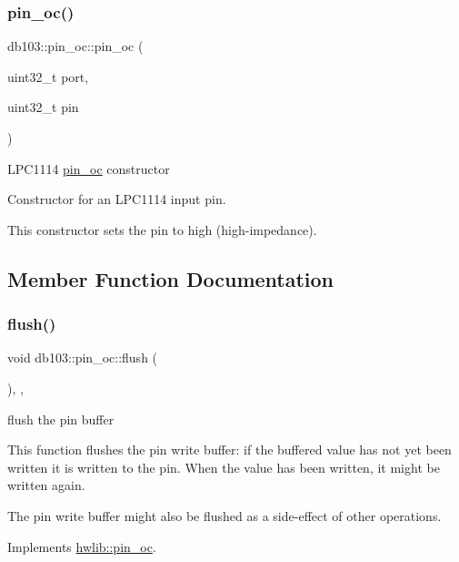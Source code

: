\subsubsection{\texorpdfstring{pin\+\_\+oc()}{pin\_oc()}}
{\footnotesize\ttfamily db103\+::pin\+\_\+oc\+::pin\+\_\+oc (\begin{DoxyParamCaption}\item[{uint32\+\_\+t}]{port,  }\item[{uint32\+\_\+t}]{pin }\end{DoxyParamCaption})\hspace{0.3cm}{\ttfamily [inline]}}

L\+P\+C1114 \hyperlink{classdb103_1_1pin__oc}{pin\+\_\+oc} constructor

Constructor for an L\+P\+C1114 input pin.

This constructor sets the pin to high (high-\/impedance). 

\subsection{Member Function Documentation}
\mbox{\label{classdb103_1_1pin__oc_a9aa19305905fe3a647fe1fa50a243dae}} 
\subsubsection{\texorpdfstring{flush()}{flush()}}
{\footnotesize\ttfamily void db103\+::pin\+\_\+oc\+::flush (\begin{DoxyParamCaption}{ }\end{DoxyParamCaption})\hspace{0.3cm}{\ttfamily [inline]}, {\ttfamily [override]}, {\ttfamily [virtual]}}





flush the pin buffer

This function flushes the pin write buffer\+: if the buffered value has not yet been written it is written to the pin. When the value has been written, it might be written again.

The pin write buffer might also be flushed as a side-\/effect of other operations. 

Implements \hyperlink{classhwlib_1_1pin__oc_a021036a4566c712e43250ddd28a85e54}{hwlib\+::pin\+\_\+oc}.

